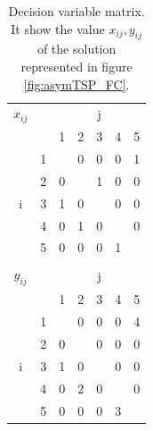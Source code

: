 \begin{table}[h!]
	\begin{center}
		\caption{Decision variable matrix. It show the value $ x_{ij}, y_{ij} $ of the solution represented in figure \ref{fig:asymTSP_FC}.}
		\label{tab:asymTSP_FC_solution}
		\begin{tabular}{cc|c|c|c|c|c|}
			
$ x_{ij} $ & \multicolumn{1}{c}{} & \multicolumn{5}{c}{j} \\ %
& \multicolumn{1}{c}{} & \multicolumn{1}{c}{1} & \multicolumn{1}{c}{2} & \multicolumn{1}{c}{3} & \multicolumn{1}{c}{4} & \multicolumn{1}{c}{5} \\ \cline{3-7}
\multirow{5}{*}{i} 	& 1 & \cellcolor{Black} & 0 & 0 & 0 & 1 \\ \cline{3-7}
& 2 & 0 & \cellcolor{Black} & 1 & 0 & 0 \\ \cline{3-7}
& 3 & 1 & 0 & \cellcolor{Black} & 0 & 0 \\ \cline{3-7}
& 4 & 0 & 1 & 0 & \cellcolor{Black} & 0 \\ \cline{3-7}
& 5 & 0 & 0 & 0 & 1 & \cellcolor{Black} \\ \cline{3-7}
\multicolumn{7}{c}{} \\ 

$ y_{ij} $ & \multicolumn{1}{c}{} & \multicolumn{5}{c}{j} \\ %
& \multicolumn{1}{c}{} & \multicolumn{1}{c}{1} & \multicolumn{1}{c}{2} & \multicolumn{1}{c}{3} & \multicolumn{1}{c}{4} & \multicolumn{1}{c}{5} \\ \cline{3-7}
\multirow{5}{*}{i} 	& 1 & \cellcolor{Black} & 0 & 0 & 0 & 4 \\ \cline{3-7}
					& 2 & 0 & \cellcolor{Black} & 0 & 0 & 0 \\ \cline{3-7}
					& 3 & 1 & 0 & \cellcolor{Black} & 0 & 0 \\ \cline{3-7}
					& 4 & 0 & 2 & 0 & \cellcolor{Black} & 0 \\ \cline{3-7}
					& 5 & 0 & 0 & 0 & 3 & \cellcolor{Black} \\ \cline{3-7}
			
		\end{tabular}
	\end{center}
\end{table}